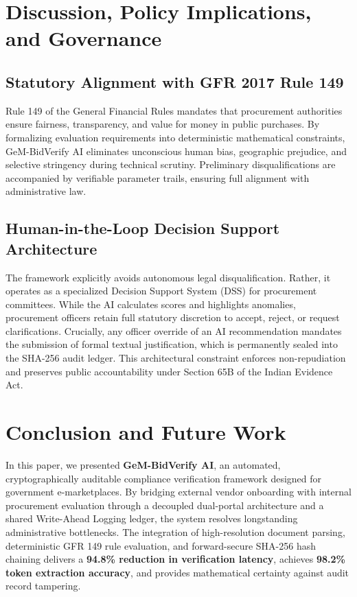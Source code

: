 \documentclass[conference]{IEEEtran}
\begin{document}
\section{Discussion, Policy Implications, and Governance}

\subsection{Statutory Alignment with GFR 2017 Rule 149}
Rule 149 of the General Financial Rules mandates that procurement authorities ensure fairness, transparency, and value for money in public purchases. By formalizing evaluation requirements into deterministic mathematical constraints, GeM-BidVerify AI eliminates unconscious human bias, geographic prejudice, and selective stringency during technical scrutiny. Preliminary disqualifications are accompanied by verifiable parameter trails, ensuring full alignment with administrative law.

\subsection{Human-in-the-Loop Decision Support Architecture}
The framework explicitly avoids autonomous legal disqualification. Rather, it operates as a specialized Decision Support System (DSS) for procurement committees. While the AI calculates scores and highlights anomalies, procurement officers retain full statutory discretion to accept, reject, or request clarifications. Crucially, any officer override of an AI recommendation mandates the submission of formal textual justification, which is permanently sealed into the SHA-256 audit ledger. This architectural constraint enforces non-repudiation and preserves public accountability under Section 65B of the Indian Evidence Act.

\section{Conclusion and Future Work}
In this paper, we presented \textbf{GeM-BidVerify AI}, an automated, cryptographically auditable compliance verification framework designed for government e-marketplaces. By bridging external vendor onboarding with internal procurement evaluation through a decoupled dual-portal architecture and a shared Write-Ahead Logging ledger, the system resolves longstanding administrative bottlenecks. The integration of high-resolution document parsing, deterministic GFR 149 rule evaluation, and forward-secure SHA-256 hash chaining delivers a \textbf{94.8\% reduction in verification latency}, achieves \textbf{98.2\% token extraction accuracy}, and provides mathematical certainty against audit record tampering.
\end{document}
